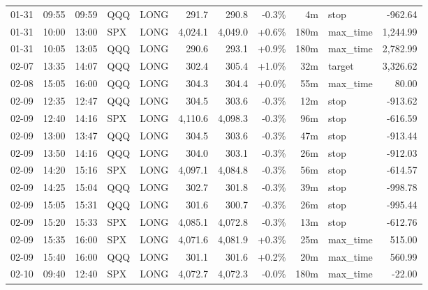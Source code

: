 \documentclass[11pt,a4paper,twoside]{article}
\begin{document}
\begin{center}
\begin{longtable}{>{\color{txtmain}}l l l l l r r r r >{\color{txtmain}}l r}
01-31 & 09:55 & 09:59 & QQQ & LONG & 291.7 & 290.8 & \textcolor{lossred}{-0.3\%} & 4m & stop & \textcolor{lossred}{-962.64} \\
01-31 & 10:00 & 13:00 & SPX & LONG & 4,024.1 & 4,049.0 & \textcolor{wingreen}{+0.6\%} & 180m & max\_time & \textcolor{wingreen}{1,244.99} \\
01-31 & 10:05 & 13:05 & QQQ & LONG & 290.6 & 293.1 & \textcolor{wingreen}{+0.9\%} & 180m & max\_time & \textcolor{wingreen}{2,782.99} \\
02-07 & 13:35 & 14:07 & QQQ & LONG & 302.4 & 305.4 & \textcolor{wingreen}{+1.0\%} & 32m & target & \textcolor{wingreen}{3,326.62} \\
02-08 & 15:05 & 16:00 & QQQ & LONG & 304.3 & 304.4 & \textcolor{wingreen}{+0.0\%} & 55m & max\_time & \textcolor{wingreen}{80.00} \\
02-09 & 12:35 & 12:47 & QQQ & LONG & 304.5 & 303.6 & \textcolor{lossred}{-0.3\%} & 12m & stop & \textcolor{lossred}{-913.62} \\
02-09 & 12:40 & 14:16 & SPX & LONG & 4,110.6 & 4,098.3 & \textcolor{lossred}{-0.3\%} & 96m & stop & \textcolor{lossred}{-616.59} \\
02-09 & 13:00 & 13:47 & QQQ & LONG & 304.5 & 303.6 & \textcolor{lossred}{-0.3\%} & 47m & stop & \textcolor{lossred}{-913.44} \\
02-09 & 13:50 & 14:16 & QQQ & LONG & 304.0 & 303.1 & \textcolor{lossred}{-0.3\%} & 26m & stop & \textcolor{lossred}{-912.03} \\
02-09 & 14:20 & 15:16 & SPX & LONG & 4,097.1 & 4,084.8 & \textcolor{lossred}{-0.3\%} & 56m & stop & \textcolor{lossred}{-614.57} \\
02-09 & 14:25 & 15:04 & QQQ & LONG & 302.7 & 301.8 & \textcolor{lossred}{-0.3\%} & 39m & stop & \textcolor{lossred}{-998.78} \\
02-09 & 15:05 & 15:31 & QQQ & LONG & 301.6 & 300.7 & \textcolor{lossred}{-0.3\%} & 26m & stop & \textcolor{lossred}{-995.44} \\
02-09 & 15:20 & 15:33 & SPX & LONG & 4,085.1 & 4,072.8 & \textcolor{lossred}{-0.3\%} & 13m & stop & \textcolor{lossred}{-612.76} \\
02-09 & 15:35 & 16:00 & SPX & LONG & 4,071.6 & 4,081.9 & \textcolor{wingreen}{+0.3\%} & 25m & max\_time & \textcolor{wingreen}{515.00} \\
02-09 & 15:40 & 16:00 & QQQ & LONG & 301.1 & 301.6 & \textcolor{wingreen}{+0.2\%} & 20m & max\_time & \textcolor{wingreen}{560.99} \\
02-10 & 09:40 & 12:40 & SPX & LONG & 4,072.7 & 4,072.3 & \textcolor{lossred}{-0.0\%} & 180m & max\_time & \textcolor{lossred}{-22.00} \\

\end{longtable}
\end{center}
\end{document}
